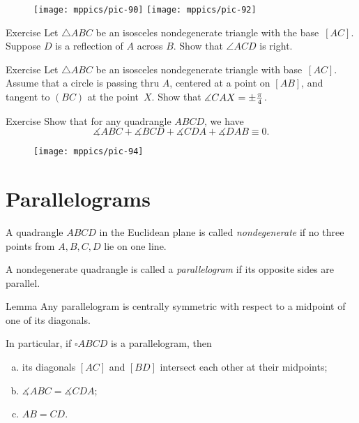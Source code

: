 {

\begin{wrapfigure}{r}{30mm}
\vskip-12mm
\centering
\texttt{[image: mppics/pic-90]}
\vskip4mm
\texttt{[image: mppics/pic-92]}
\end{wrapfigure}

\begin{thm}{Exercise}\label{ex:right-isos}
Let $\triangle ABC$ be an isosceles nondegenerate triangle with the base~$[AC]$.
Suppose $D$ is a reflection of $A$ across $B$.
Show that $\angle ACD$ is right.
\end{thm}



\begin{thm}{Exercise}\label{ex:pi/4-isos}
Let $\triangle ABC$ be an isosceles nondegenerate triangle with base~$[AC]$. 
Assume that a circle is passing thru $A$,
centered at a point on $[AB]$,
and tangent to $(BC)$ at the point~$X$.
Show that $\measuredangle CAX\z=\pm\tfrac\pi4$.
\end{thm}

}

\begin{thm}{Exercise}\label{ex:quadrangle}
Show that for any quadrangle $ABCD$, we have
$$\measuredangle ABC+\measuredangle BCD+\measuredangle CDA+\measuredangle DAB\equiv 0.$$

\end{thm}

{

\begin{wrapfigure}{r}{26mm}
\vskip2mm
\centering
\texttt{[image: mppics/pic-94]}
\end{wrapfigure}

\section*{Parallelograms}

A quadrangle $ABCD$ in the Euclidean plane is called \emph{nondegenerate} if no three points from $A,B,C,D$ lie on one line.

}
A nondegenerate quadrangle  is called a \emph{parallelogram}
if its opposite sides are parallel.



\begin{thm}{Lemma}\label{lem:parallelogram}
Any parallelogram is centrally symmetric with respect to a midpoint of one of its diagonals.

In particular, if $\square A B C D$ is a parallelogram, then
\begin{enumerate}[(a)]
\item its diagonals $[AC]$ and $[BD]$ intersect each other at their midpoints;
\item $\measuredangle A B C= \measuredangle C D A$;
\item $AB=CD$.
\end{enumerate}
\end{thm}

